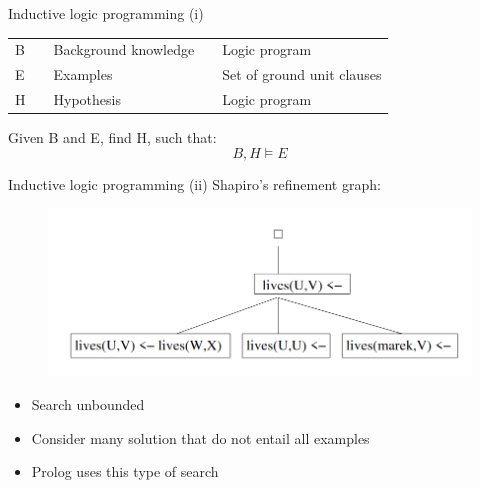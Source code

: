 \begin{frame}{Inductive logic programming (i)}
\begin{center}
\vfill
\begin{tabular}{lllll}
B && Background knowledge && Logic program \\
E && Examples && Set of ground unit clauses \\
H && Hypothesis && Logic program
\end{tabular}
\vfill
Given B and E, find H, such that:
$$ B, H \models E $$
\vfill
\end{center}
\end{frame}

\begin{frame}{Inductive logic programming (ii)}
\vfill
Shapiro's refinement graph:
\vfill
\begin{figure}
    \centering
    \includegraphics[width=.5\textwidth]{images/Shapiro's graph.png}
\end{figure}
\vfill
\begin{itemize}
    \item Search unbounded
    \item Consider many solution that do not entail all examples
    \item Prolog uses this type of search
\end{itemize}

\end{frame}

